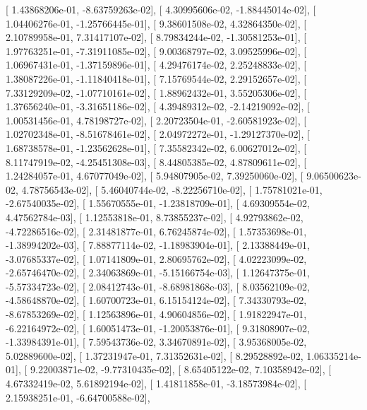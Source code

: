 \documentclass{article}
\begin{document}
       [  1.43868206e-01,  -8.63759263e-02],
       [  4.30995606e-02,  -1.88445014e-02],
       [  1.04406276e-01,  -1.25766445e-01],
       [  9.38601508e-02,   4.32864350e-02],
       [  2.10789958e-01,   7.31417107e-02],
       [  8.79834244e-02,  -1.30581253e-01],
       [  1.97763251e-01,  -7.31911085e-02],
       [  9.00368797e-02,   3.09525996e-02],
       [  1.06967431e-01,  -1.37159896e-01],
       [  4.29476174e-02,   2.25248833e-02],
       [  1.38087226e-01,  -1.11840418e-01],
       [  7.15769544e-02,   2.29152657e-02],
       [  7.33129209e-02,  -1.07710161e-02],
       [  1.88962432e-01,   3.55205306e-02],
       [  1.37656240e-01,  -3.31651186e-02],
       [  4.39489312e-02,  -2.14219092e-02],
       [  1.00531456e-01,   4.78198727e-02],
       [  2.20723504e-01,  -2.60581923e-02],
       [  1.02702348e-01,  -8.51678461e-02],
       [  2.04972272e-01,  -1.29127370e-02],
       [  1.68738578e-01,  -1.23562628e-01],
       [  7.35582342e-02,   6.00627012e-02],
       [  8.11747919e-02,  -4.25451308e-03],
       [  8.44805385e-02,   4.87809611e-02],
       [  1.24284057e-01,   4.67077049e-02],
       [  5.94807905e-02,   7.39250060e-02],
       [  9.06500623e-02,   4.78756543e-02],
       [  5.46040744e-02,  -8.22256710e-02],
       [  1.75781021e-01,  -2.67540035e-02],
       [  1.55670555e-01,  -1.23818709e-01],
       [  4.69309554e-02,   4.47562784e-03],
       [  1.12553818e-01,   8.73855237e-02],
       [  4.92793862e-02,  -4.72286516e-02],
       [  2.31481877e-01,   6.76245874e-02],
       [  1.57353698e-01,  -1.38994202e-03],
       [  7.88877114e-02,  -1.18983904e-01],
       [  2.13388449e-01,  -3.07685337e-02],
       [  1.07141809e-01,   2.80695762e-02],
       [  4.02223099e-02,  -2.65746470e-02],
       [  2.34063869e-01,  -5.15166754e-03],
       [  1.12647375e-01,  -5.57334723e-02],
       [  2.08412743e-01,  -8.68981868e-03],
       [  8.03562109e-02,  -4.58648870e-02],
       [  1.60700723e-01,   6.15154124e-02],
       [  7.34330793e-02,  -8.67853269e-02],
       [  1.12563896e-01,   4.90604856e-02],
       [  1.91822947e-01,  -6.22164972e-02],
       [  1.60051473e-01,  -1.20053876e-01],
       [  9.31808907e-02,  -1.33984391e-01],
       [  7.59543736e-02,   3.34670891e-02],
       [  3.95368005e-02,   5.02889600e-02],
       [  1.37231947e-01,   7.31352631e-02],
       [  8.29528892e-02,   1.06335214e-01],
       [  9.22003871e-02,  -9.77310435e-02],
       [  8.65405122e-02,   7.10358942e-02],
       [  4.67332419e-02,   5.61892194e-02],
       [  1.41811858e-01,  -3.18573984e-02],
       [  2.15938251e-01,  -6.64700588e-02],
\end{document}
